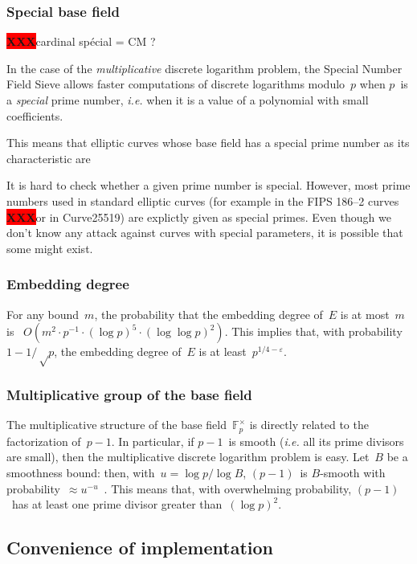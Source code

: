 \documentclass{article}
\def\F{\mathbb{F}}
\def\XXX{{\colorbox{red}{{\color{white}\bfseries XXX}}}}
\begin{document}
\subsubsection{Special base field}
\label{sss:special-anormal}

\XXX cardinal spécial = CM ?

In the case of the \emph{multiplicative} discrete logarithm problem,
the Special Number Field Sieve allows faster computations
of discrete logarithms modulo~$p$
when $p$~is a \emph{special} prime number,
\emph{i.e.} when it is a value of a polynomial with small coefficients.

This means that elliptic curves whose base field
has a special prime number as its characteristic
are


It is hard to check whether a given prime number is special.
However, most prime numbers used in standard elliptic curves
(for example in the FIPS 186--2 curves \XXX or in Curve25519)
are explictly given as special primes.
Even though we don't know any attack against curves with special parameters,
it is possible that some might exist.

\subsubsection{Embedding degree}

For any bound~$m$, the probability that
the embedding degree of~$E$ is at most~$m$
is~\cite{jcrypto1998bk} $O(m^2 · p^{-1}·(\log p)^5·(\log\log p)^2)$.
This implies that, with probability~$1 - 1/√p$,
the embedding degree of~$E$ is at least~$p^{1/4 - ε}$.

\subsubsection{Multiplicative group of the base field}

The multiplicative structure of the base field~$\F_p^{×}$
is directly related to the factorization of~$p-1$.
In particular, if $p-1$~is smooth
(\emph{i.e.} all its prime divisors are small),
then the multiplicative discrete logarithm problem is easy.
Let~$B$ be a smoothness bound: then, with~$u = \log p / \log B$,
$(p-1)$~is $B$-smooth with probability~$≈ u^{-u}$~\cite{jnt1983cep}.
This means that, with overwhelming probability,
$(p-1)$~has at least one prime divisor greater than~$(\log p)^2$.

\subsection{Convenience of implementation}
\label{ss:convenience}
\end{document}
